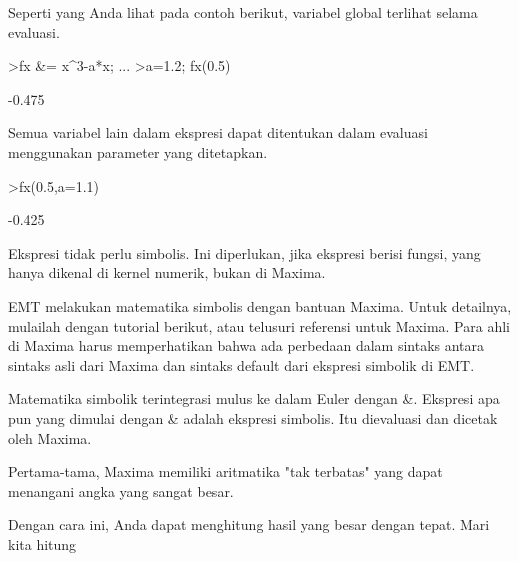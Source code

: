 \documentclass[12pt,Times new roman,letterpaper]{book}
\begin{document}
\begin{eulernootebook}
\begin{eulercomment}
\begin{eulercomment}
\begin{eulernootebook}
\begin{eulercomment}
Seperti yang Anda lihat pada contoh berikut, variabel global terlihat
selama evaluasi.
\end{eulercomment}
\begin{eulerprompt}
>fx &= x^3-a*x;  ...
>a=1.2; fx(0.5)
\end{eulerprompt}
\begin{euleroutput}
  -0.475
\end{euleroutput}
\begin{eulercomment}
Semua variabel lain dalam ekspresi dapat ditentukan dalam evaluasi
menggunakan parameter yang ditetapkan.
\end{eulercomment}
\begin{eulerprompt}
>fx(0.5,a=1.1)
\end{eulerprompt}
\begin{euleroutput}
  -0.425
\end{euleroutput}
\begin{eulercomment}
Ekspresi tidak perlu simbolis. Ini diperlukan, jika ekspresi berisi
fungsi, yang hanya dikenal di kernel numerik, bukan di Maxima.

\begin{eulercomment}
\begin{eulercomment}
EMT melakukan matematika simbolis dengan bantuan Maxima. Untuk
detailnya, mulailah dengan tutorial berikut, atau telusuri referensi
untuk Maxima. Para ahli di Maxima harus memperhatikan bahwa ada
perbedaan dalam sintaks antara sintaks asli dari Maxima dan sintaks
default dari ekspresi simbolik di EMT.

Matematika simbolik terintegrasi mulus ke dalam Euler dengan \&.
Ekspresi apa pun yang dimulai dengan \& adalah ekspresi simbolis. Itu
dievaluasi dan dicetak oleh Maxima.

Pertama-tama, Maxima memiliki aritmatika "tak terbatas" yang dapat
menangani angka yang sangat besar.
\end{eulercomment}
\begin{eulercomment}
Dengan cara ini, Anda dapat menghitung hasil yang besar dengan tepat.
Mari kita hitung


\end{eulercomment}
\end{eulercomment}
\end{eulercomment}
\end{eulernootebook}
\end{eulercomment}
\end{eulercomment}
\end{eulernootebook}
\end{document}
